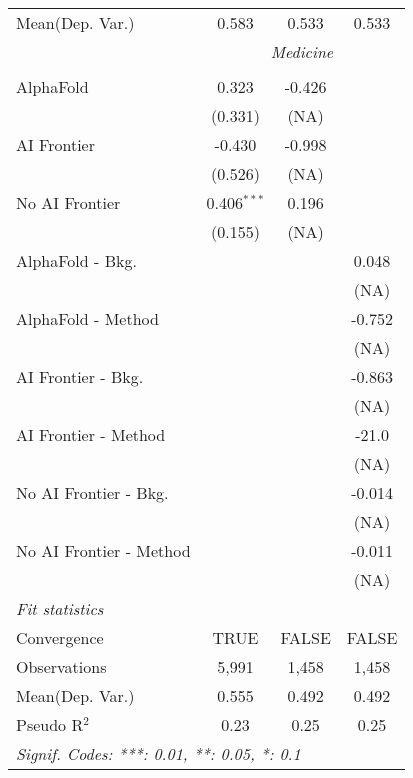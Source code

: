 \begin{tabular}{lccc}
Mean(Dep. Var.) & 0.583 & 0.533 & 0.533 \\
 & \multicolumn{3}{c}{\textit{Medicine}} \\ \\
   AlphaFold               & 0.323         & -0.426 &   \\   
                           & (0.331)       & (NA)   &   \\   
   AI Frontier             & -0.430        & -0.998 &   \\   
                           & (0.526)       & (NA)   &   \\   
   No AI Frontier          & 0.406$^{***}$ & 0.196  &   \\   
                           & (0.155)       & (NA)   &   \\   
   AlphaFold - Bkg.        &               &        & 0.048\\   
                           &               &        & (NA)\\   
   AlphaFold - Method      &               &        & -0.752\\   
                           &               &        & (NA)\\   
   AI Frontier - Bkg.      &               &        & -0.863\\   
                           &               &        & (NA)\\   
   AI Frontier - Method    &               &        & -21.0\\   
                           &               &        & (NA)\\   
   No AI Frontier - Bkg.   &               &        & -0.014\\   
                           &               &        & (NA)\\   
   No AI Frontier - Method &               &        & -0.011\\   
                           &               &        & (NA)\\   
   \midrule
   \emph{Fit statistics}\\
   Convergence             &TRUE           & FALSE  & FALSE\\  
   Observations            & 5,991         & 1,458  & 1,458\\  
Mean(Dep. Var.) & 0.555 & 0.492 & 0.492 \\
   Pseudo R$^2$            & 0.23          & 0.25   & 0.25\\  
   \midrule \midrule
   \multicolumn{4}{l}{\emph{Signif. Codes: ***: 0.01, **: 0.05, *: 0.1}}\\
\end{tabular}
\par\endgroup
